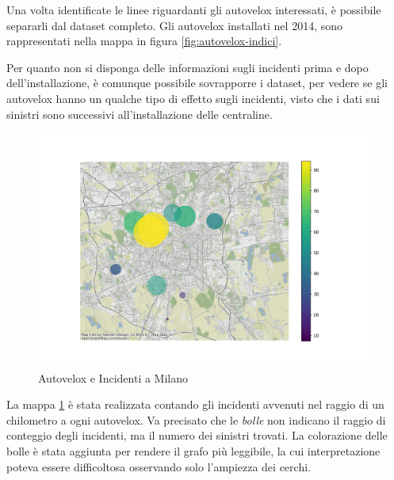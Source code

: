 \documentclass[a4paper]{report}
\begin{document}
Una volta identificate le linee riguardanti gli autovelox interessati, è possibile separarli 
dal dataset completo.
Gli autovelox installati nel 2014, sono rappresentati nella mappa in 
figura \ref{fig:autovelox-indici}.

Per quanto non si disponga delle informazioni sugli incidenti prima e dopo dell'installazione, 
è comunque possibile sovrapporre i dataset, per vedere se gli autovelox hanno un qualche tipo di 
effetto sugli incidenti, visto che i dati sui sinistri sono successivi all'installazione delle centraline.

\begin{figure}
    \includegraphics[width=\linewidth]{../src/autovelox/correlazione.png}
    \caption{Autovelox e Incidenti a Milano}
    \label{fig:autovelox-incidenti}
\end{figure}

La mappa \ref{fig:autovelox-incidenti} è stata realizzata contando gli incidenti avvenuti 
nel raggio di un chilometro a ogni autovelox.
Va precisato che le \textit{bolle} non indicano il raggio di conteggio degli incidenti, ma 
il numero dei sinistri trovati. La colorazione delle bolle è stata aggiunta per rendere il 
grafo più leggibile, la cui interpretazione poteva essere difficoltosa osservando solo l'ampiezza 
dei cerchi.
\end{document}
